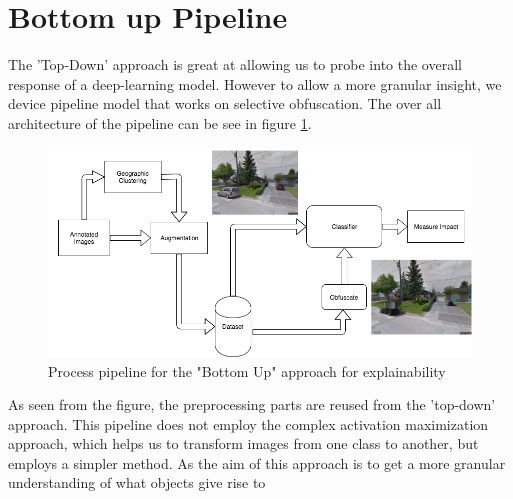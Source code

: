 \section{Bottom up Pipeline}

The 'Top-Down' approach is great at allowing us to probe into the overall response of a deep-learning model. 
However to allow a more granular insight, we device pipeline model that works on selective obfuscation. 
The over all architecture of the pipeline can be see in figure \ref{fig:bottomup}. 
 \begin{figure}[ht]
	\centering
	\includegraphics[width=1.5\columnwidth]{Plot/BottomupPipeline.png}
	\caption{Process pipeline for the "Bottom Up" approach for explainability}
	\label{fig:bottomup}
\end{figure}

As seen from the figure, the preprocessing parts are reused from the 'top-down' approach. 
This pipeline does not employ the complex activation maximization approach, which helps us to 
transform images from one class to another, but employs a simpler method. As the aim of this approach
is to get a more granular understanding of what objects give rise to 